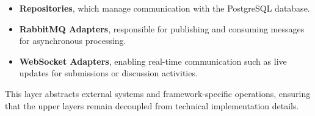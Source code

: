 \begin{enumerate}
\begin{itemize}
    \item \textbf{Repositories}, which manage communication with the PostgreSQL database.
    \item \textbf{RabbitMQ Adapters}, responsible for publishing and consuming messages for asynchronous processing.
    \item \textbf{WebSocket Adapters}, enabling real-time communication such as live updates for submissions or discussion activities.
\end{itemize}

This layer abstracts external systems and framework-specific operations, ensuring that the upper layers remain decoupled from technical implementation details.

\end{enumerate}